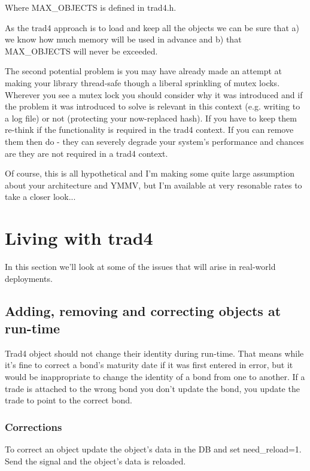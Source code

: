 \documentclass{report}
\begin{document}
Where MAX_OBJECTS is defined in trad4.h.

As the trad4 approach is to load and keep all the objects we can be sure that a) we know how much memory will be used in advance and b) that MAX_OBJECTS will never be exceeded.

The second potential problem is you may have already made an attempt at making your library thread-safe though a liberal sprinkling of mutex locks. Wherever you see a mutex lock you should consider why it was introduced and if the problem it was introduced to solve is relevant in this context (e.g. writing to a log file) or not (protecting your now-replaced hash). If you have to keep them re-think if the functionality is required in the trad4 context. If you can remove them then do - they can severely degrade your system's performance and chances are they are not required in a trad4 context.

Of course, this is all hypothetical and I'm making some quite large assumption about your architecture and YMMV, but I'm available at very resonable rates to take a closer look...










\chapter{Living with trad4}

In this section we'll look at some of the issues that will arise in real-world deployments.

\section{Adding, removing and correcting objects at run-time}

Trad4 object should not change their identity during run-time. That means while it's fine to correct a bond's maturity date if it was first entered in error, but it would be inappropriate to change the identity of a bond from one to another. If a trade is attached to the wrong bond you don't update the bond, you update the trade to point to the correct bond.

\subsection{Corrections}

To correct an object update the object's data in the DB and set need_reload=1. Send the signal and the object's data is reloaded.
\end{document}
